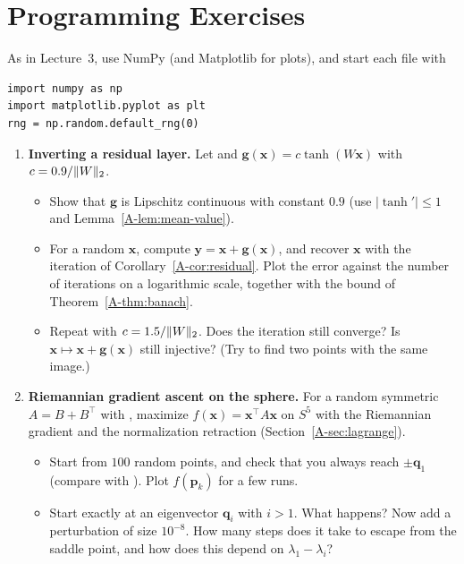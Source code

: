 \section*{Programming Exercises}

\setlength{\emergencystretch}{3em}

As in Lecture~3, use NumPy (and Matplotlib for plots), and start each file with
\begin{lstlisting}
import numpy as np
import matplotlib.pyplot as plt
rng = np.random.default_rng(0)
\end{lstlisting}

\begin{enumerate}[label=\textbf{P\arabic*.}, leftmargin=*]
    \item \textbf{Inverting a residual layer.} Let  and $\mathbf{g}(\mathbf{x}) = c\tanh(W\mathbf{x})$ with $c = 0.9/\lVert W \rVert_2$.
    \begin{itemize}
        \item Show that $\mathbf{g}$ is Lipschitz continuous with constant $0.9$ (use $|\tanh'| \leq 1$ and Lemma~\ref{A-lem:mean-value}).
        \item For a random $\mathbf{x}$, compute $\mathbf{y} = \mathbf{x} + \mathbf{g}(\mathbf{x})$, and recover $\mathbf{x}$ with the iteration of Corollary~\ref{A-cor:residual}. Plot the error against the number of iterations on a logarithmic scale, together with the bound of Theorem~\ref{A-thm:banach}.
        \item Repeat with $c = 1.5/\lVert W \rVert_2$. Does the iteration still converge? Is $\mathbf{x} \mapsto \mathbf{x} + \mathbf{g}(\mathbf{x})$ still injective? (Try to find two points with the same image.)
    \end{itemize}

    \item \textbf{Riemannian gradient ascent on the sphere.} For a random symmetric $A = B + B^\top$ with , maximize $f(\mathbf{x}) = \mathbf{x}^\top A\mathbf{x}$ on $S^5$ with the Riemannian gradient and the normalization retraction (Section~\ref{A-sec:lagrange}).
    \begin{itemize}
        \item Start from $100$ random points, and check that you always reach $\pm\mathbf{q}_1$ (compare with ). Plot $f(\mathbf{p}_k)$ for a few runs.
        \item Start exactly at an eigenvector $\mathbf{q}_i$ with $i > 1$. What happens? Now add a perturbation of size $10^{-8}$. How many steps does it take to escape from the saddle point, and how does this depend on $\lambda_1 - \lambda_i$?
    \end{itemize}


\end{enumerate}

